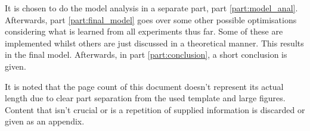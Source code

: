 It is chosen to do the model analysis in a separate part, part \ref{part:model_anal}.
Afterwards, part \ref{part:final_model} goes over some other possible optimisations considering what is learned from all experiments thus far.
Some of these are implemented whilst others are just discussed in a theoretical manner.
This results in the final model.
Afterwards, in part \ref{part:conclusion}, a short conclusion is given.

It is noted that the page count of this document doesn't represent its actual length due to clear part separation from the used template and large figures.
Content that isn't crucial or is a repetition of supplied information is discarded or given as an appendix.